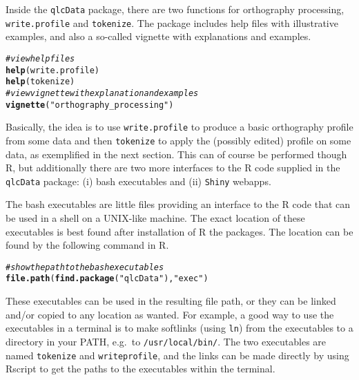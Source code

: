 \documentclass[output=book,nonflat,modfonts,
colorlinks, citecolor=brown,
		]{langsci/langscibook}\usepackage[]{graphicx}\usepackage[]{color}
\makeatletter
\newcommand{\hlstr}[1]{\textcolor[rgb]{0.192,0.494,0.8}{#1}}%
\newcommand{\hlcom}[1]{\textcolor[rgb]{0.678,0.584,0.686}{\textit{#1}}}%
\newcommand{\hlstd}[1]{\textcolor[rgb]{0.345,0.345,0.345}{#1}}%
\newcommand{\hlkwd}[1]{\textcolor[rgb]{0.737,0.353,0.396}{\textbf{#1}}}%
\newenvironment{kframe}{%
 \def\at@end@of@kframe{}%
 \ifinner\ifhmode%
  \def\at@end@of@kframe{\end{minipage}}%
  \begin{minipage}{\columnwidth}%
 \fi\fi%
 \def\FrameCommand##1{\hskip\@totalleftmargin \hskip-\fboxsep
 \colorbox{shadecolor}{##1}\hskip-\fboxsep
     \hskip-\linewidth \hskip-\@totalleftmargin \hskip\columnwidth}%
 \MakeFramed {\advance\hsize-\width
   \@totalleftmargin\z@ \linewidth\hsize
   \@setminipage}}%
 {\par\unskip\endMakeFramed%
 \at@end@of@kframe}
\newenvironment{knitrout}{}{} %
\makeatother
\begin{document}
Inside the \texttt{qlcData} package, there are two functions for
orthography processing, \texttt{write.profile} and \texttt{tokenize}. The package includes
help files with illustrative examples, and also a so-called vignette with
explanations and examples.

\begin{knitrout}\footnotesize
{}\color{fgcolor}\begin{kframe}
\begin{alltt}
\hlcom{# view help files}
\hlkwd{help}\hlstd{(write.profile)}
\hlkwd{help}\hlstd{(tokenize)}
\hlcom{# view vignette with explanation and examples}
\hlkwd{vignette}\hlstd{(}\hlstr{"orthography_processing"}\hlstd{)}
\end{alltt}
\end{kframe}
\end{knitrout}

Basically, the idea is to use \texttt{write.profile} to produce a
basic orthography profile from some data and then \texttt{tokenize} to apply the
(possibly edited) profile on some data, as exemplified in the next section. This
can of course be performed though R, but additionally there are two more
interfaces to the R code supplied in the \texttt{qlcData} package: (i) bash
executables and (ii) \texttt{Shiny} webapps.

The bash executables are little files providing an interface to the R code that
can be used in a shell on a UNIX-like machine. The exact location of these
executables is best found after installation of R the packages. The
location can be found by the following command in R. 

\begin{knitrout}\footnotesize
{}\color{fgcolor}\begin{kframe}
\begin{alltt}
\hlcom{# show the path to the bash executables}
\hlkwd{file.path}\hlstd{(}\hlkwd{find.package}\hlstd{(}\hlstr{"qlcData"}\hlstd{),} \hlstr{"exec"}\hlstd{)}
\end{alltt}
\end{kframe}
\end{knitrout}

These executables can be 
used in the resulting file path, or they can be linked and/or copied to any location as wanted. 
For example, a good way to use the executables in a terminal is to
make softlinks (using \texttt{ln}) from the executables to a directory in your
PATH, e.g.\ to \texttt{/usr/local/bin/}. The two executables are named
\texttt{tokenize} and \texttt{writeprofile}, and the links can be made directly 
by using Rscript to get the paths to the executables within the terminal.
\end{document}
